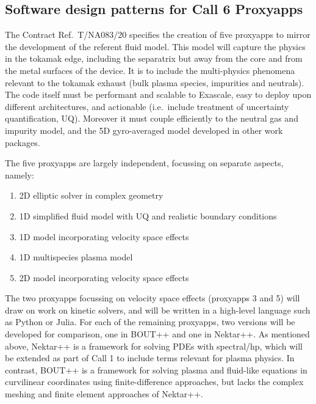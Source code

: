 \subsection{Software design patterns for Call 6 Proxyapps}\label{sec:call6}


The Contract Ref.\ T/NA083/20 specifies the creation of five proxyapps to
mirror the development of the referent fluid model.
This model will capture the physics in the tokamak edge, including the
separatrix but away from the core and from the metal surfaces of the device.
It is to include the multi-physics phenomena relevant to the tokamak exhaust
(bulk plasma species, impurities and neutrals).  
The code itself must be performant and scalable to Exascale, easy to deploy
upon different architectures, and actionable (i.e.\ include treatment of
uncertainty quantification, UQ).  
Moreover it must couple efficiently to the neutral gas and impurity model, and
the 5D gyro-averaged model developed in other work packages.

The five proxyapps are largely independent, focussing on separate aspects, namely:
\begin{enumerate}
	\item 2D elliptic solver in complex geometry
	\item 1D simplified fluid model with UQ and realistic boundary conditions
	\item 1D model incorporating velocity space effects
	\item 1D multispecies plasma model
	\item 2D model incorporating velocity space effects
\end{enumerate}


The two proxyapps focussing on velocity space effects (proxyapps 3 and 5) will draw on work on
kinetic solvers, and will be written in a high-level language such as Python or Julia.
For each of the remaining proxyapps, two versions will be developed for
comparison, one in BOUT++ \cite{BOUT++} and one in Nektar++.
As mentioned above, Nektar++ is a framework for solving PDEs with spectral/hp, which will be extended as part of Call 1 to include terms relevant for plasma physics.
In contrast, BOUT++ is a framework for solving plasma and fluid-like equations in curvilinear coordinates using finite-difference approaches,
but lacks the complex meshing and finite element approaches of Nektar++.

